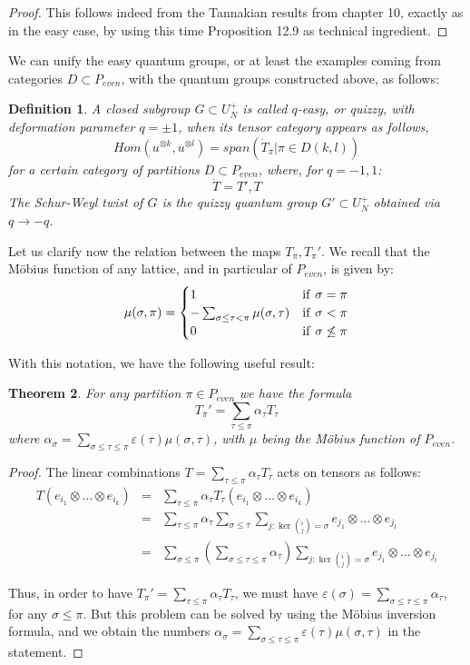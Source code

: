 \documentclass[12pt]{amsbook}
\newtheorem{theorem}{Theorem}[chapter]
\newtheorem{definition}[theorem]{Definition}
\begin{document}
\begin{proof}
This follows indeed from the Tannakian results from chapter 10, exactly as in the easy case, by using this time Proposition 12.9 as technical ingredient.
\end{proof}

We can unify the easy quantum groups, or at least the examples coming from categories $D\subset P_{even}$, with the quantum groups constructed above, as follows:

\begin{definition}
A closed subgroup $G\subset U_N^+$ is called $q$-easy, or quizzy, with deformation parameter $q=\pm1$, when its tensor category appears as follows,
$$Hom(u^{\otimes k},u^{\otimes l})=span\left(\dot{T}_\pi\Big|\pi\in D(k,l)\right)$$
for a certain category of partitions $D\subset P_{even}$, where, for $q=-1,1$:
$$\dot{T}=T',T$$
The Schur-Weyl twist of $G$ is the quizzy quantum group $G'\subset U_N^+$ obtained via $q\to-q$.
\end{definition}

Let us clarify now the relation between the maps $T_\pi,T_\pi'$. We recall that the M\"obius function of any lattice, and in particular of $P_{even}$, is given by:
$$\mu(\sigma,\pi)=\begin{cases}
1&{\rm if}\ \sigma=\pi\\
-\sum_{\sigma\leq\tau<\pi}\mu(\sigma,\tau)&{\rm if}\ \sigma<\pi\\
0&{\rm if}\ \sigma\not\leq\pi
\end{cases}$$

With this notation, we have the following useful result:


\begin{theorem}
For any partition $\pi\in P_{even}$ we have the formula
$$T_\pi'=\sum_{\tau\leq\pi}\alpha_\tau T_\tau$$
where $\alpha_\sigma=\sum_{\sigma\leq\tau\leq\pi}\varepsilon(\tau)\mu(\sigma,\tau)$, with $\mu$ being the M\"obius function of $P_{even}$.
\end{theorem}

\begin{proof}
The linear combinations $T=\sum_{\tau\leq\pi}\alpha_\tau T_\tau$ acts on tensors as follows:
\begin{eqnarray*}
T(e_{i_1}\otimes\ldots\otimes e_{i_k})
&=&\sum_{\tau\leq\pi}\alpha_\tau T_\tau(e_{i_1}\otimes\ldots\otimes e_{i_k})\\
&=&\sum_{\tau\leq\pi}\alpha_\tau\sum_{\sigma\leq\tau}\sum_{j:\ker(^i_j)=\sigma}e_{j_1}\otimes\ldots\otimes e_{j_l}\\
&=&\sum_{\sigma\leq\pi}\left(\sum_{\sigma\leq\tau\leq\pi}\alpha_\tau\right)\sum_{j:\ker(^i_j)=\sigma}e_{j_1}\otimes\ldots\otimes e_{j_l}
\end{eqnarray*}

Thus, in order to have $T_\pi'=\sum_{\tau\leq\pi}\alpha_\tau T_\tau$, we must have $\varepsilon(\sigma)=\sum_{\sigma\leq\tau\leq\pi}\alpha_\tau$, for any $\sigma\leq\pi$. But this problem can be solved by using the M\"obius inversion formula, and we obtain the numbers $\alpha_\sigma=\sum_{\sigma\leq\tau\leq\pi}\varepsilon(\tau)\mu(\sigma,\tau)$ in the statement.
\end{proof}
\end{document}
